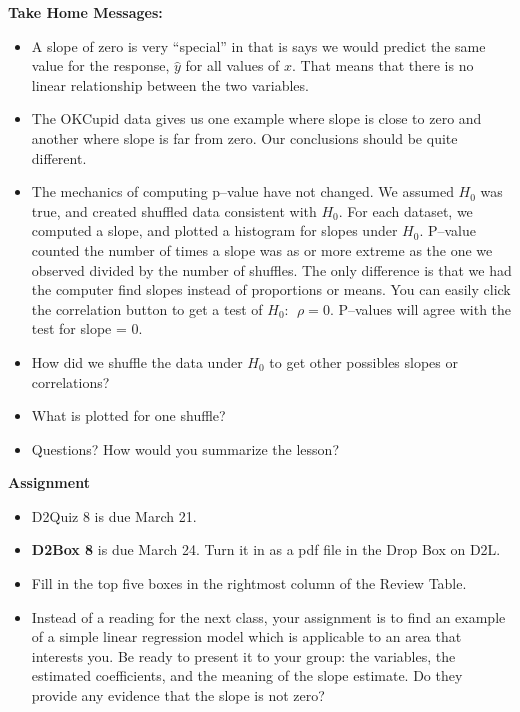 \begin{center}
  {\bf Take Home Messages:}\vspace{-.4cm}
\end{center}
\begin{itemize}
  \item A slope of zero is very ``special'' in that is says we would
    predict the same value for the response, $\hat{y}$ for all values
    of $x$.  That means that there is no linear relationship between
    the two variables.
  \item The OKCupid data gives us one example where slope is close to
    zero and another where slope is far from zero.  Our conclusions
    should be quite different.
  \item The mechanics of computing p--value have not changed.  We
    assumed $H_0$ was true, and created shuffled data consistent with
    $H_0$.  For each dataset, we computed a slope, and plotted a
    histogram for slopes under $H_0$. P--value counted the number of
    times a slope was as or more extreme as the one we observed
    divided by the number of shuffles.  The only difference is that we
    had the computer find slopes instead of proportions or means.  You
    can easily click the correlation button to get a test of $H_0:\ \
    \rho = 0$. P--values will agree with the test for slope = 0.
  \item How did we shuffle the data under $H_0$ to get other possibles
    slopes or correlations?
  \item What is plotted for one shuffle?
 \item 
 Questions? How would you summarize the lesson? \vspace*{\fill}

\end{itemize}


\noindent
{\bf Assignment} \vspace{-.2in}
\begin{itemize}
\item  D2Quiz 8 is due March 21.
\item {\bf D2Box 8} is due March 24.  Turn it in as a pdf file in the
  Drop Box on D2L. 
\item Fill in the top five boxes in the rightmost column   of
  the Review Table.
\item Instead of a reading for the next class, your assignment is to
  find an example of a simple linear regression model which is
  applicable to an area that interests you.  Be ready to present it to
  your group:  the variables, the estimated coefficients, and the
  meaning of the slope estimate.  Do they provide any evidence that
  the slope is not zero?
\end{itemize}
